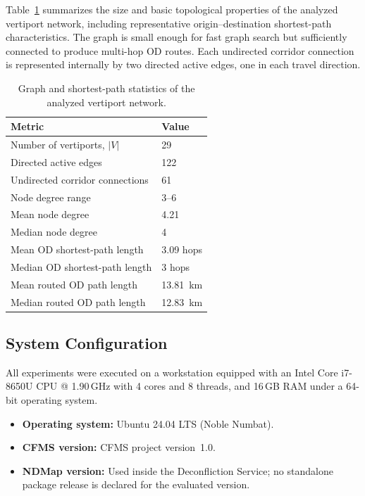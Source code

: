 Table~\ref{tab:network_stats} summarizes the size and basic topological properties of the analyzed vertiport network, including representative origin--destination shortest-path characteristics. The graph is small enough for fast graph search but sufficiently connected to produce multi-hop OD routes. Each undirected corridor connection is represented internally by two directed active edges, one in each travel direction.

\begin{table}[H]
    \centering
    \caption{Graph and shortest-path statistics of the analyzed vertiport network.}
    \label{tab:network_stats}
    \begin{tabularx}{\textwidth}{lX}
        \toprule
        Metric & Value \\
        \midrule
        Number of vertiports, \(|V|\) & 29 \\
        Directed active edges & 122 \\
        Undirected corridor connections & 61 \\
        Node degree range & 3--6 \\
        Mean node degree & 4.21 \\
        Median node degree & 4 \\
        Mean OD shortest-path length & 3.09 hops \\
        Median OD shortest-path length & 3 hops \\
        Mean routed OD path length & \SI{13.81}{km} \\
        Median routed OD path length & \SI{12.83}{km} \\
        \bottomrule
    \end{tabularx}
\end{table}

\subsection{System Configuration}
\label{sec:system_configuration}

All experiments were executed on a workstation equipped with an Intel Core i7-8650U CPU @ 1.90\,GHz with 4 cores and 8 threads, and 16\,GB RAM under a 64-bit operating system.

\begin{itemize}
    \item \textbf{Operating system:} Ubuntu 24.04 LTS (Noble Numbat).
    \item \textbf{CFMS version:} CFMS project version~1.0.
    \item \textbf{NDMap version:} Used inside the Deconfliction Service; no standalone package release is declared for the evaluated version.
\end{itemize}


